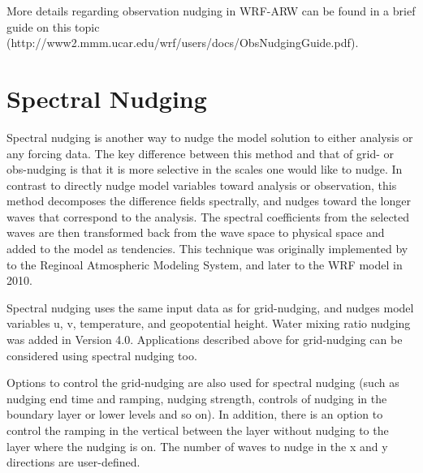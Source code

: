 More details regarding observation nudging in WRF-ARW can be found in a brief guide on this topic (http://www2.mmm.ucar.edu/wrf/users/docs/ObsNudgingGuide.pdf). 

\section{Spectral Nudging}

Spectral nudging is another way to nudge the model solution to either analysis or any forcing data. The key difference between this method and that of grid- or obs-nudging is that it is more selective in the scales one would like to nudge. In contrast to directly nudge model variables toward analysis or observation, this method decomposes the difference fields spectrally, and nudges toward the longer waves that correspond to the analysis. The spectral coefficients from the selected waves are then transformed back from the wave space to physical space and added to the model as tendencies. This technique was originally implemented by \citet{miguez04} to the Reginoal Atmospheric Modeling System, and later to the WRF model in 2010.

Spectral nudging uses the same input data as for grid-nudging, and nudges model variables u, v, temperature, and geopotential height. Water mixing ratio nudging was added in Version 4.0. Applications described above for grid-nudging can be considered using spectral nudging too.

Options to control the grid-nudging are also used for spectral nudging (such as nudging end time and ramping, nudging strength, controls of nudging in the boundary layer or lower levels and so on). In addition, there is an option to control the ramping in the vertical between the layer without nudging to the layer where the nudging is on. The number of waves to nudge in the x and y directions are user-defined.

